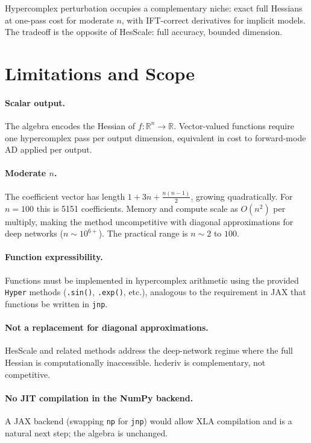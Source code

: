 \documentclass[11pt]{article}
\begin{document}
Hypercomplex perturbation occupies a complementary niche: exact full Hessians at
one-pass cost for moderate $n$, with IFT-correct derivatives for implicit models.
The tradeoff is the opposite of HesScale: full accuracy, bounded dimension.

\section{Limitations and Scope}

\paragraph{Scalar output.}
The algebra encodes the Hessian of $f:\mathbb{R}^n \to \mathbb{R}$. Vector-valued
functions require one hypercomplex pass per output dimension, equivalent in cost to
forward-mode AD applied per output.

\paragraph{Moderate $n$.}
The coefficient vector has length $1 + 3n + \frac{n(n-1)}{2}$, growing quadratically.
For $n = 100$ this is 5151 coefficients. Memory and compute scale as $O(n^2)$ per
multiply, making the method uncompetitive with diagonal approximations for deep
networks ($n \sim 10^{6+}$). The practical range is $n \sim 2$ to $100$.

\paragraph{Function expressibility.}
Functions must be implemented in hypercomplex arithmetic using the provided
\texttt{Hyper} methods (\texttt{.sin()}, \texttt{.exp()}, etc.), analogous to the
requirement in JAX that functions be written in \texttt{jnp}.

\paragraph{Not a replacement for diagonal approximations.}
HesScale and related methods address the deep-network regime where the full Hessian
is computationally inaccessible. hcderiv is complementary, not competitive.

\paragraph{No JIT compilation in the NumPy backend.}
A JAX backend (swapping \texttt{np} for \texttt{jnp}) would allow XLA compilation
and is a natural next step; the algebra is unchanged.
\end{document}
